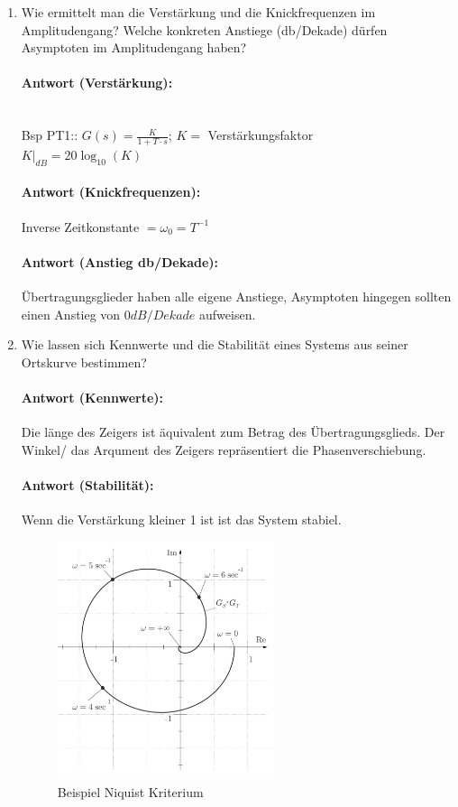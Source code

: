 \documentclass[12pt, a4paper]{article}
\begin{document}
\begin{enumerate}
    \item Wie ermittelt man die Verstärkung und die Knickfrequenzen im Amplitudengang? Welche konkreten Anstiege (db/Dekade) dürfen Asymptoten im Amplitudengang haben?
    \vspace{-16pt}\paragraph{Antwort (Verstärkung):} \mbox{} \\
    Bsp PT1:: $G(s) = \frac{K}{1+T \cdot s} $; $K=$ Verstärkungsfaktor \\
    $ K|_{dB} = 20 \log_{10}(K) $
    \vspace{-16pt}\paragraph{Antwort (Knickfrequenzen):} Inverse Zeitkonstante $= \omega_0 = T^{-1}$ 
    \vspace{-16pt}\paragraph{Antwort (Anstieg db/Dekade):} Übertragungsglieder haben alle eigene Anstiege, Asymptoten hingegen sollten einen Anstieg von $0dB/Dekade$ aufweisen.
    
    \item Wie lassen sich Kennwerte und die Stabilität eines Systems aus seiner Ortskurve bestimmen?
    \vspace{-16pt}\paragraph{Antwort (Kennwerte):} Die länge des Zeigers ist äquivalent zum Betrag des Übertragungsglieds. Der Winkel/ das Arqument des Zeigers repräsentiert die Phasenverschiebung.
    \vspace{-16pt}\paragraph{Antwort (Stabilität):} Wenn die Verstärkung kleiner 1 ist ist das System stabiel.
    \begin{figure}[H]
        \centering
        \includegraphics[width=0.6\textwidth]{nyquist_kriteriumjpg.jpg}
        \caption{Beispiel Niquist Kriterium}
    \end{figure}


\end{enumerate}
\end{document}
